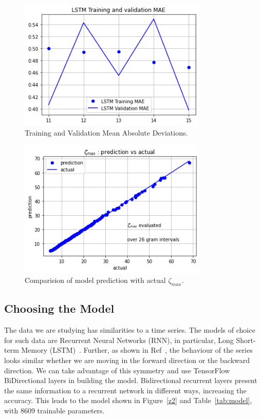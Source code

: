 \documentclass[twoside]{article}
\begin{document}
\begin{figure}
\centering
\includegraphics[width=0.8\textwidth]{3.png}
\caption[]{ 
  Training and Validation Mean Absolute Deviations.
  }
\vspace{1mm}
\label{z3}
\end{figure}

\begin{figure}
\centering
\includegraphics[width=0.8\textwidth]{4.png}
\caption[]{ 
  Comparision of model prediction with actual $\zeta_{max}$. 
  }
\vspace{1mm}
\label{z4}
\end{figure}


\subsection{\label{sec3.1} Choosing the Model}
The data we are studying has similarities to a time series. The models of choice for
such data are Recurrent Neural Networks (RNN), in particular,  
Long Short-term Memory (LSTM)~\cite{lstm}. Further, as shown in Ref~\cite{Shanker 2018a},
the behaviour of the series looks similar whether we are moving in the forward direction 
or the backward direction. We can take advantage of this symmetry and use TensorFlow
BiDirectional layers in building the model.  
Bidirectional recurrent layers present the same information to a recurrent network in different ways, 
increasing the accuracy.
This leads to the model shown in Figure~\ref{z2} and Table~\ref{tab:model}, 
with $8609$ trainable parameters.
\end{document}
